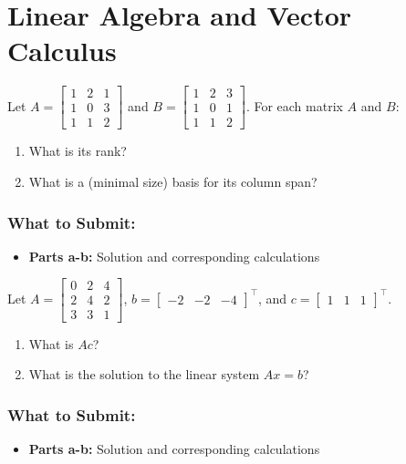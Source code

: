 \documentclass{article}
\begin{document}
\section*{Linear Algebra and Vector Calculus}
\begin{aprob}
    Let $A = \begin{bmatrix} 1 & 2 & 1 \\ 1 & 0 & 3 \\ 1 & 1 & 2 \end{bmatrix}$ and $B = \begin{bmatrix} 1 & 2 & 3 \\ 1 & 0 & 1 \\ 1 & 1 & 2 \end{bmatrix}$.
    For each matrix $A$ and $B$:
    \begin{enumerate} 
    	\item {} What is its rank? 
    	\item {} What is a (minimal size) basis for its column span?
    \end{enumerate}
    
    \subsubsection*{What to Submit:}
    \begin{itemize}
        \item \textbf{Parts a-b:} Solution and corresponding calculations
    \end{itemize}
\end{aprob}

\begin{aprob}\label{prob:linsystem}
    Let $A = \begin{bmatrix} 0 & 2 & 4 \\ 2 & 4 & 2 \\ 3 & 3 & 1 \end{bmatrix}$, $b = \begin{bmatrix} -2 & -2 & -4 \end{bmatrix}^\top$, and $c=\begin{bmatrix} 1 & 1 & 1 \end{bmatrix}^\top$.
    \begin{enumerate}
    	\item {} What is $Ac$?
    	\item {} What is the solution to the linear system $Ax = b$?
    \end{enumerate}
    
    \subsubsection*{What to Submit:}
    \begin{itemize}
        \item \textbf{Parts a-b:} Solution and corresponding calculations
    \end{itemize}
\end{aprob}
\end{document}
